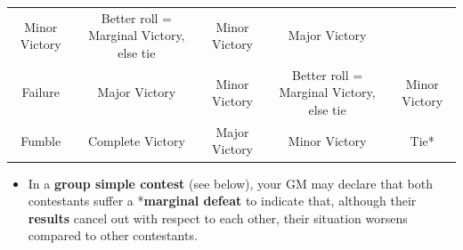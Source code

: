 \documentclass[
]{article}
\providecommand{\tightlist}{%
  \setlength{\itemsep}{0pt}\setlength{\parskip}{0pt}}
\begin{document}
\begin{longtable}[]{@{}ccccc@{}}
\begin{minipage}[t]{0.18\columnwidth}
Minor Victory\strut
\end{minipage} & \begin{minipage}[t]{0.19\columnwidth}\centering
Better roll = Marginal Victory, else tie\strut
\end{minipage} & \begin{minipage}[t]{0.19\columnwidth}\centering
Minor Victory\strut
\end{minipage} & \begin{minipage}[t]{0.19\columnwidth}\centering
Major Victory\strut
\end{minipage}\tabularnewline
\begin{minipage}[t]{0.10\columnwidth}\centering
Failure\strut
\end{minipage} & \begin{minipage}[t]{0.18\columnwidth}\centering
Major Victory\strut
\end{minipage} & \begin{minipage}[t]{0.19\columnwidth}\centering
Minor Victory\strut
\end{minipage} & \begin{minipage}[t]{0.19\columnwidth}\centering
Better roll = Marginal Victory, else tie\strut
\end{minipage} & \begin{minipage}[t]{0.19\columnwidth}\centering
Minor Victory\strut
\end{minipage}\tabularnewline
\begin{minipage}[t]{0.10\columnwidth}\centering
Fumble\strut
\end{minipage} & \begin{minipage}[t]{0.18\columnwidth}\centering
Complete Victory\strut
\end{minipage} & \begin{minipage}[t]{0.19\columnwidth}\centering
Major Victory\strut
\end{minipage} & \begin{minipage}[t]{0.19\columnwidth}\centering
Minor Victory\strut
\end{minipage} & \begin{minipage}[t]{0.19\columnwidth}\centering
Tie*\strut
\end{minipage}\tabularnewline
\bottomrule
\end{longtable}

\begin{itemize}
\tightlist
\item
  In a \textbf{group simple contest} (see below), your GM may declare
  that both contestants suffer a *\textbf{marginal defeat} to indicate
  that, although their \textbf{results} cancel out with respect to each
  other, their situation worsens compared to other contestants.
\end{itemize}
\end{document}
